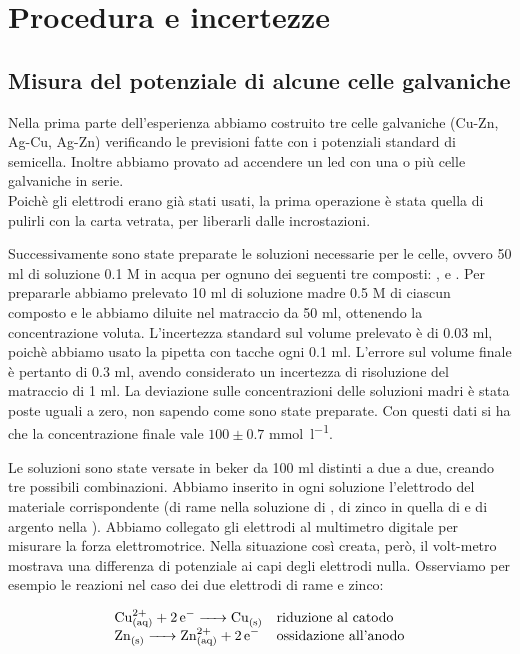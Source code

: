 \section*{Procedura e incertezze}

\subsection*{Misura del potenziale di alcune celle galvaniche}

Nella prima parte dell'esperienza abbiamo costruito tre celle galvaniche (Cu-Zn, Ag-Cu, Ag-Zn) verificando le previsioni fatte con i potenziali standard di semicella.
Inoltre abbiamo provato ad accendere un led con una o più celle galvaniche in serie.
\\

Poichè gli elettrodi erano già stati usati, la prima operazione è stata quella di pulirli con la carta vetrata, per liberarli dalle incrostazioni.

Successivamente sono state preparate le soluzioni necessarie per le celle, ovvero 50 ml di soluzione 0.1 M in acqua per ognuno dei seguenti tre composti: ,  e .
Per prepararle abbiamo prelevato 10 ml di soluzione madre 0.5 M di ciascun composto e le abbiamo diluite nel matraccio da 50 ml, ottenendo la concentrazione voluta.
L'incertezza standard sul volume prelevato è di 0.03 ml, poichè abbiamo usato la pipetta con tacche ogni 0.1 ml.
L'errore sul volume finale è pertanto di 0.3 ml, avendo considerato un incertezza di risoluzione del matraccio di 1 ml.
La deviazione sulle concentrazioni delle soluzioni madri è stata poste uguali a zero, non sapendo come sono
state preparate.
Con questi dati si ha che la concentrazione finale vale $100 \pm 0.7$ \si{\milli\mol\per\litre}.

Le soluzioni sono state versate in beker da 100 ml distinti a due a due, creando tre possibili combinazioni.
Abbiamo inserito in ogni soluzione l'elettrodo del materiale corrispondente (di rame nella soluzione di , di zinco in quella di  e di argento nella ).
Abbiamo collegato gli elettrodi al multimetro digitale per misurare la forza elettromotrice.
Nella situazione così creata, però, il volt-metro mostrava una differenza di potenziale ai capi degli elettrodi nulla.
Osserviamo per esempio le reazioni nel caso dei due elettrodi di rame e zinco:

\begin{equation}
    \begin{array}{l l}
        \ce{Cu^{2+}_{(aq)} + 2e- -> Cu_{(s)}} & \text{riduzione al catodo} \\
        \ce{Zn_{(s)} -> Zn^{2+}_{(aq)} + 2e-} & \text{ossidazione all'anodo} \\
    \end{array}
\end{equation}

